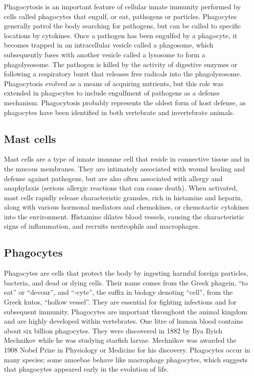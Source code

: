 Phagocytosis is an important feature of cellular innate immunity performed by cells called phagocytes that engulf, or eat, pathogens or particles. Phagocytes generally patrol the body searching for pathogens, but can be called to specific locations by cytokines. Once a pathogen has been engulfed by a phagocyte, it becomes trapped in an intracellular vesicle called a phagosome, which subsequently fuses with another vesicle called a lysosome to form a phagolysosome. The pathogen is killed by the activity of digestive enzymes or following a respiratory burst that releases free radicals into the phagolysosome. Phagocytosis evolved as a means of acquiring nutrients, but this role was extended in phagocytes to include engulfment of pathogens as a defense mechanism. Phagocytosis probably represents the oldest form of host defense, as phagocytes have been identified in both vertebrate and invertebrate animals.

\hypertarget{mast-cells}{%
\subsection{Mast cells}\label{mast-cells}}

Mast cells are a type of innate immune cell that reside in connective tissue and in the mucous membranes. They are intimately associated with wound healing and defense against pathogens, but are also often associated with allergy and anaphylaxis (serious allergic reactions that can cause death). When activated, mast cells rapidly release characteristic granules, rich in histamine and heparin, along with various hormonal mediators and chemokines, or chemotactic cytokines into the environment. Histamine dilates blood vessels, causing the characteristic signs of inflammation, and recruits neutrophils and macrophages.

\hypertarget{phagocytes}{%
\subsection{Phagocytes}\label{phagocytes}}

Phagocytes are cells that protect the body by ingesting harmful foreign particles, bacteria, and dead or dying cells. Their name comes from the Greek phagein, ``to eat'' or ``devour'', and ``-cyte'', the suffix in biology denoting ``cell'', from the Greek kutos, ``hollow vessel''. They are essential for fighting infections and for subsequent immunity. Phagocytes are important throughout the animal kingdom and are highly developed within vertebrates. One litre of human blood contains about six billion phagocytes. They were discovered in 1882 by Ilya Ilyich Mechnikov while he was studying starfish larvae. Mechnikov was awarded the 1908 Nobel Prize in Physiology or Medicine for his discovery. Phagocytes occur in many species; some amoebae behave like macrophage phagocytes, which suggests that phagocytes appeared early in the evolution of life.

